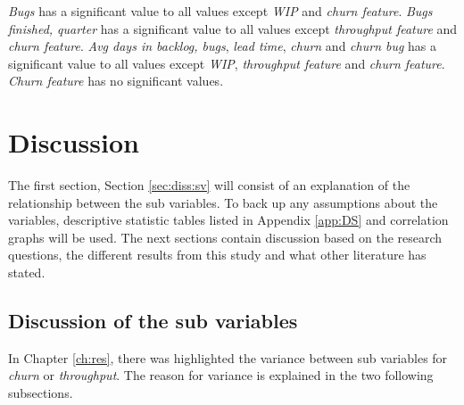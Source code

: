 \documentclass[UKenglish]{ifimaster}  %
\begin{document}
\textit{Bugs} has a significant value to all values except \textit{WIP} and \textit{churn feature}. \textit{Bugs finished, quarter} has a significant value to all values except \textit{throughput feature} and \textit{churn feature}. \textit{Avg days in backlog, bugs}, \textit{lead time}, \textit{churn} and \textit{churn bug} has a significant value to all values except \textit{WIP}, \textit{throughput feature} and \textit{churn feature}. \textit{Churn feature} has no significant values.


\chapter{Discussion}
\label{ch:dis}
The first section, Section \ref{sec:diss:sv} will consist of an explanation of the relationship between the sub variables. To back up any assumptions about the variables, descriptive statistic tables listed in Appendix \ref{app:DS} and correlation graphs will be used. The next sections contain discussion based on the research questions, the different results from this study and what other literature has stated. 



\section{Discussion of the sub variables}
In Chapter \ref{ch:res}, there was highlighted the variance between sub variables for \textit{churn} or \textit{throughput}. The reason for variance is explained in the two following subsections.
\label{sec:diss:sv}
\end{document}
